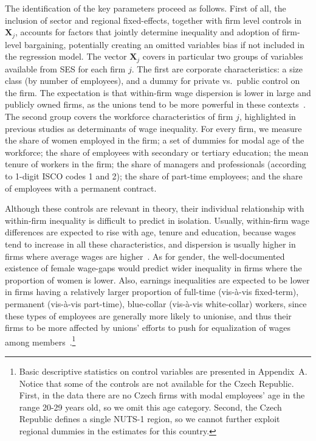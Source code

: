 \documentclass[12pt]{article}
\begin{document}
The identification of the key parameters proceed as follows. First of all, the inclusion of sector and regional fixed-effects, together with firm level controls in $\bm{X}_j$, accounts for factors that jointly determine inequality and adoption of firm-level bargaining, potentially creating an omitted variables bias if not included in the regression model. The vector $\bm{X}_j$ covers in particular two groups of variables available from SES for each firm $j$. The first are corporate characteristics: a size class (by number of employees), and a dummy for private vs.\ public control on the firm. The expectation is that within-firm wage dispersion is lower in large and publicly owned firms, as the unions tend to be more powerful in these contexts~\citep{canaldominguez.gutierrez.2004}. The second group covers the workforce characteristics of firm $j$, highlighted in previous studies as determinants of wage inequality. For every firm, we measure the share of women employed in the firm; a set of dummies for modal age of the workforce; the share of employees with secondary or tertiary education; the mean tenure of workers in the firm; the share of managers and professionals (according to 1-digit ISCO codes 1 and 2); the share of part-time employees; and the share of employees with a permanent contract. 

Although these controls are relevant in theory, their individual relationship with within-firm inequality is difficult to predict in isolation. Usually, within-firm wage differences are expected to rise with age, tenure and education, because wages tend to increase in all these characteristics, and dispersion is usually higher in firms where average wages are higher~\citep{canaldominguez.gutierrez.2004}. As for gender, the well-documented existence of female wage-gaps would predict wider inequality in firms where the proportion of women is lower. Also, earnings inequalities are expected to be lower in firms having a relatively larger proportion of full-time (vis-à-vis fixed-term), permanent (vis-à-vis part-time), blue-collar (vis-à-vis white-collar) workers, since these types of employees are generally more likely to unionise, and thus their firms to be more affected by unions' efforts to push for equalization of wages among members~\citep{canaldominguez.gutierrez.2004}.\footnote{Basic descriptive statistics on control variables are presented in Appendix~A. Notice that some of the controls are not available for the Czech Republic. First, in the data there are no Czech firms with modal employees' age in the range 20-29 years old, so we omit this age category. Second, the Czech Republic defines a single NUTS-1 region, so we cannot further exploit regional dummies in the estimates for this country.}
\end{document}
